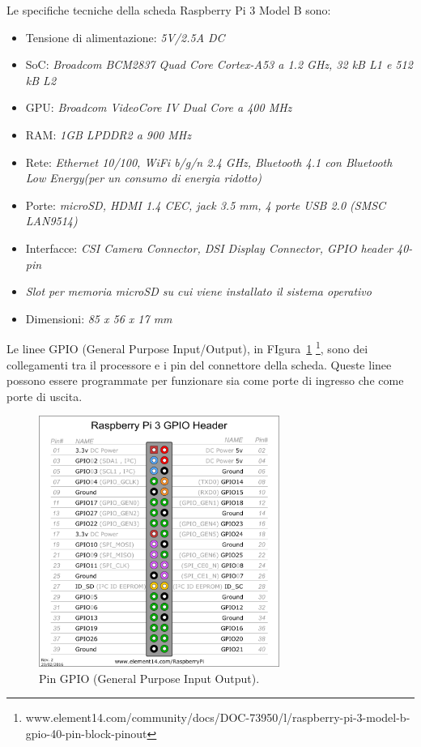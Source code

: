 Le specifiche tecniche della scheda Raspberry Pi 3 Model B sono:
\begin{itemize}
    \item Tensione di alimentazione: \textit{5V/2.5A DC}
    \item SoC: \textit{Broadcom BCM2837 Quad Core Cortex-A53 a 1.2 GHz, 32 kB L1 e 512 kB L2}
    \item GPU: \textit{Broadcom VideoCore IV Dual Core a 400 MHz}
    \item RAM: \textit{1GB LPDDR2 a 900 MHz}
    \item Rete: \textit{Ethernet 10/100, WiFi b/g/n 2.4 GHz, Bluetooth 4.1 con Bluetooth Low Energy(per un consumo di energia ridotto)}
    \item Porte: \textit{microSD, HDMI 1.4 CEC, jack 3.5 mm, 4 porte USB 2.0 (SMSC LAN9514)}
    \item Interfacce: \textit{CSI Camera Connector, DSI  Display Connector, GPIO header 40-pin}
    \item \textit{Slot per memoria microSD su cui viene installato il sistema operativo}
    \item Dimensioni: \textit{85 x 56 x 17 mm}
\end{itemize}

Le linee GPIO (General Purpose Input/Output), in FIgura~\ref{photo_gpio}
\footnote{www.element14.com/community/docs/DOC-73950/l/raspberry-pi-3-model-b-gpio-40-pin-block-pinout}, 
sono dei collegamenti tra il processore e i pin del 
connettore della scheda. Queste linee possono essere programmate per funzionare sia come porte di ingresso che come porte di uscita.

\begin{figure}[htb!]
    \centering
    \includegraphics[width=0.7\textwidth]{images/gpio.png}
    \caption{Pin GPIO (General Purpose Input Output).}
    \label{photo_gpio}
\end{figure}

